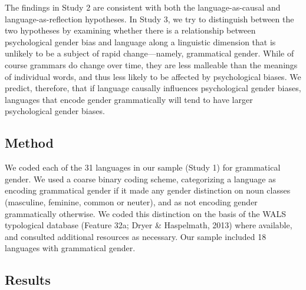 \documentclass[10pt, letterpaper]{article}
\begin{document}
The findings in Study 2 are consistent with both the language-as-causal
and language-as-reflection hypotheses. In Study 3, we try to distinguish
between the two hypotheses by examining whether there is a relationship
between psychological gender bias and language along a linguistic
dimension that is unlikely to be a subject of rapid change---namely,
grammatical gender. While of course grammars do change over time, they
are less malleable than the meanings of individual words, and thus less
likely to be affected by psychological biases. We predict, therefore,
that if language causally influences psychological gender biases,
languages that encode gender grammatically will tend to have larger
psychological gender biases.

\subsection{Method}\label{method-3}

We coded each of the 31 languages in our sample (Study 1) for
grammatical gender. We used a coarse binary coding scheme, categorizing
a language as encoding grammatical gender if it made any gender
distinction on noun classes (masculine, feminine, common or neuter), and
as not encoding gender grammatically otherwise. We coded this
distinction on the basis of the WALS typological database (Feature 32a;
Dryer \& Haspelmath, 2013) where available, and consulted additional
resources as necessary. Our sample included 18 languages with
grammatical gender.

\subsection{Results}\label{results-3}
\end{document}
